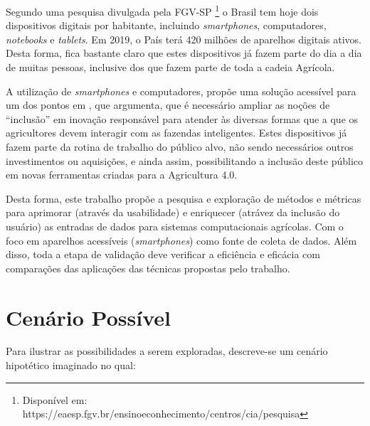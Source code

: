\documentclass[12pt]{article}
\begin{document}
Segundo uma pesquisa divulgada pela FGV-SP \footnote{Disponível em: https://eaesp.fgv.br/ensinoeconhecimento/centros/cia/pesquisa} o Brasil tem hoje dois dispositivos digitais por habitante, incluindo \textit{smartphones}, computadores, \textit{notebooks} e \textit{tablets}. Em 2019, o País terá 420 milhões de aparelhos digitais ativos. Desta forma, fica bastante claro que estes dispositivos já fazem parte do dia a dia de muitas pessoas, inclusive dos que fazem parte de toda a cadeia Agrícola.

A utilização de \textit{smartphones} e computadores, propõe uma solução acessível para um dos pontos em \cite{agriculture-40-rose}, que argumenta, que é necessário ampliar as noções de ``inclusão'' em inovação responsável para atender às diversas formas que a que os agricultores devem interagir com as fazendas inteligentes. Estes dispositivos já fazem parte da rotina de trabalho do público alvo, não sendo necessários outros investimentos ou aquisições, e ainda assim, possibilitando a inclusão deste público em novas ferramentas criadas para a Agricultura 4.0.

Desta forma, este trabalho propõe a pesquisa e exploração de métodos e métricas para aprimorar (através da usabilidade) e enriquecer (atrávez da inclusão do usuário) as entradas de dados para sistemas computacionais agrícolas. Com o foco em aparelhos acessíveis (\textit{smartphones}) como fonte de coleta de dados. Além disso, toda a etapa de validação deve verificar a eficiência e eficácia com comparações das aplicações das técnicas propostas pelo trabalho.

\section{Cenário Possível}

Para ilustrar as possibilidades a serem exploradas, descreve-se um cenário hipotético imaginado no qual:
\end{document}
